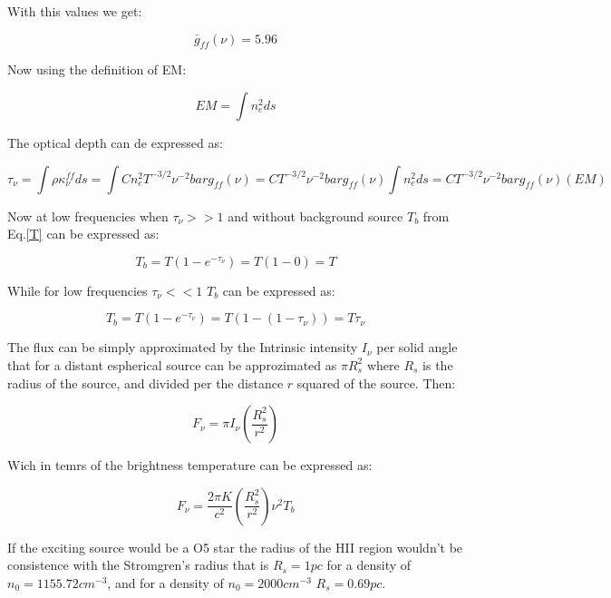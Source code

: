 \documentclass[12pt]{article}
\begin{document}
With this values we get:

\begin{equation}
\bar{g}_{ff}(\nu) = 5.96
\end{equation}

Now using the definition of EM:

\begin{equation}
EM = \int n_e^2 ds
\end{equation}

The optical depth can de expressed as:

\begin{equation}
\tau_{\nu} = \int \rho \kappa_{\nu}^{ff} ds = 
\int C n_e^2 T^{-3/2}\nu^{-2}bar{g}_{ff}(\nu)
=  C T^{-3/2}\nu^{-2}bar{g}_{ff}(\nu) \int n_e^2 ds 
= C T^{-3/2}\nu^{-2}bar{g}_{ff}(\nu) (EM)
\end{equation}

Now at low frequencies when $\tau_{\nu}>>1$ and without background source $T_b$
from Eq.\ref{T} can be expressed as: 

\begin{equation}
T_b = T(1-e^{-\tau_{\nu}}) = T(1 - 0) = T
\end{equation}


While for low frequencies $\tau_{\nu}<<1$ $T_b$ can be expressed as:

\begin{equation}
T_b = T(1-e^{-\tau_{\nu}}) = T(1 -(1- \tau_{\nu})) = T\tau_{\nu}
\end{equation}

The flux can be simply approximated by the Intrinsic intensity $I_{\nu}$
per solid angle that for a distant espherical source can be approzimated 
as $\pi R_s^2$ where $R_s$ is the radius of the source, and divided per 
the distance $r$ squared of the source. Then:

\begin{equation}
F_{\nu} = \pi I_{\nu} \left( \dfrac{R_s^2}{r^2}\right) 
\end{equation}
 
Wich in temrs of the brightness temperature can be expressed as:

\begin{equation}
F_{\nu} = \dfrac{2\pi K}{c^2} \left( \dfrac{R_s^2}{r^2}\right)  \nu^2 T_{b}
\end{equation}


If the exciting source would be a O5 star the radius of the HII region
wouldn't be consistence with the Stromgren's radius that is $R_s = 1 pc$
for a density of $n_0 = 1155.72 cm^{-3}$, and for a density of $n_0 = 2000 cm^{-3}$ $R_s = 0.69 pc$. 
 
\end{document}
